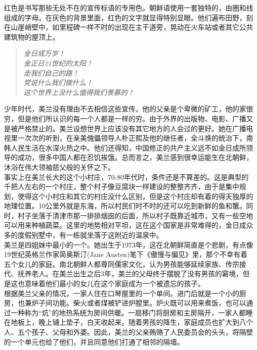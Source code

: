 红色是书写那些无处不在的宣传标语的专用色。朝鲜语使用一套独特的，由圈和线组成的字母。在灰色的背景里面，红色的文字就显得特别显眼。他们遍布田野，刻在山崖峭壁中，如里程碑一样不时的出现在主干道旁，晃动在火车站或者其它公共建筑物的屋顶上。\\

\begin{quote}
	\begin{spacing}{1.0}  %
		\textit{{\footnotesize 	金日成万岁！\\
		金正日21世纪的太阳！\\
		走我们自己的路！\\
		党说什么我们做什么！\\
		这个世界上没什么值得我们羡慕的！\\}}
	\end{spacing}
\end{quote}

少年时代，美兰没有理由不去相信这些宣传。他的父亲是个卑微的矿工，他的家很穷，但是他们所认识的每一个人都是一样的穷。由于外界的出版物、电影、广播又是被严格禁止的。美兰设想世界上应该没有其它地方的人会过的更好。她在广播电视里一次次的听到，在亲美傀儡领导人朴正熙及他的继任者，全斗焕的统治下，南韩人民生活在水深火热之中。他们还得知，中国修正的共产主义远不如金日成所领导的成功，很多中国人都在忍饥挨饿。总而言之，美兰感到很幸运能生在北朝鲜，沐浴在伟大领袖慈父般的关怀之下。\\

事实上在美兰长大的这个小村庄，70-80年代时，条件还是不算差的。这是典型的千把人左右的一个村庄，整个村子像豆腐块一样建设的整整齐齐，由于是集中规划，使得这个小村庄和其它的村庄没什么区别，但是这个村庄却有着的得天独厚的地理位置。10公里外就是东海，所以村民们时不时的还可以吃到新鲜的鱼和蟹。同时，村子坐落于清津市那一排排烟囱的后面，所以村子既靠近城市，又有一些空地可以用来种植蔬菜。这里的地势相对平坦，这在这个国家是非常难得的，金日成众多的度假别墅中，有一栋就坐落于这附近的温泉中。\\

美兰是四姐妹中最小的一个。她出生于1973年，这在北朝鲜简直是个悲剧，有点像19世纪英格兰作家简奥斯汀(Jane Austen)笔下《傲慢与偏见》里，那个不幸有着五个女儿的家庭。南北朝鲜人都尊同儒家文化，认为男孩能够延续家族、传宗接代、抚养老人。在美兰出生之后3年，美兰的父母终于摆脱了没有男孩的窘境，但是这也意味着他们最小的女儿在这个家庭成为一个被遗忘的孩子。\\

根据美兰父亲的情况，一家人住在口琴屋里的一个单间。进门后就是一个小的厨房，也兼炉子间功能。柴火或者煤被铲进炉膛里。炉火既可以用来煮饭，也可以通过一种称为“炕”的地热系统为房间供暖。一扇移门将厨房和主房隔开，一家人都睡在地板上，晚上铺上垫子，白天收起来。随着男孩的降生，家庭成员也扩大到八个人、五个孩子、父母和外婆。因此，美兰的父亲贿赂了人民委员会的头头，将隔壁的一个单元也给了他们，并且同意他们打通了相邻的隔墙。\\

